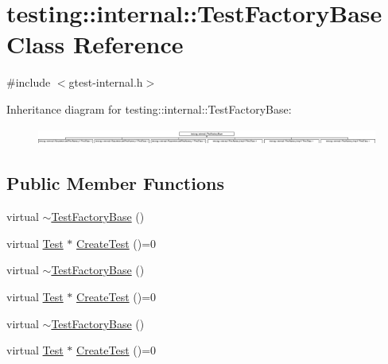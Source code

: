 \hypertarget{classtesting_1_1internal_1_1_test_factory_base}{}\section{testing\+::internal\+::Test\+Factory\+Base Class Reference}
\label{classtesting_1_1internal_1_1_test_factory_base}


{\ttfamily \#include $<$gtest-\/internal.\+h$>$}

Inheritance diagram for testing\+::internal\+::Test\+Factory\+Base\+:\begin{figure}[H]
\begin{center}
\leavevmode
\includegraphics[height=0.555556cm]{d8/d8b/classtesting_1_1internal_1_1_test_factory_base}
\end{center}
\end{figure}
\subsection*{Public Member Functions}
\begin{DoxyCompactItemize}
\item 
virtual \mbox{\hyperlink{classtesting_1_1internal_1_1_test_factory_base_a18f22a7594336a36642289c1decddc9e}{$\sim$\+Test\+Factory\+Base}} ()
\item 
virtual \mbox{\hyperlink{classtesting_1_1_test}{Test}} $\ast$ \mbox{\hyperlink{classtesting_1_1internal_1_1_test_factory_base_a07ac3ca0b196cdb092da0bb186b7c030}{Create\+Test}} ()=0
\item 
virtual \mbox{\hyperlink{classtesting_1_1internal_1_1_test_factory_base_a18f22a7594336a36642289c1decddc9e}{$\sim$\+Test\+Factory\+Base}} ()
\item 
virtual \mbox{\hyperlink{classtesting_1_1_test}{Test}} $\ast$ \mbox{\hyperlink{classtesting_1_1internal_1_1_test_factory_base_a07ac3ca0b196cdb092da0bb186b7c030}{Create\+Test}} ()=0
\item 
virtual \mbox{\hyperlink{classtesting_1_1internal_1_1_test_factory_base_a18f22a7594336a36642289c1decddc9e}{$\sim$\+Test\+Factory\+Base}} ()
\item 
virtual \mbox{\hyperlink{classtesting_1_1_test}{Test}} $\ast$ \mbox{\hyperlink{classtesting_1_1internal_1_1_test_factory_base_a07ac3ca0b196cdb092da0bb186b7c030}{Create\+Test}} ()=0
\end{DoxyCompactItemize}
